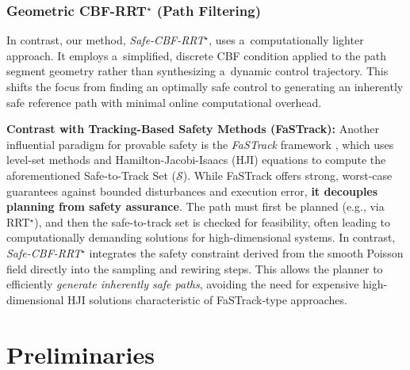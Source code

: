 \documentclass{svproc}
\begin{document}
\subsubsection{Geometric CBF-RRT$^\star$ (Path Filtering)}
    In contrast,
    our method, \emph{Safe-CBF-RRT$^\star$}, uses a~computationally lighter
    approach. It employs a~simplified, discrete CBF condition applied to the
    path segment geometry rather than synthesizing a~dynamic control trajectory.
    This shifts the focus from finding an optimally safe control to generating an
    inherently safe reference path with minimal online computational overhead.

\textbf{Contrast with Tracking-Based Safety Methods (FaSTrack):} Another
influential paradigm for provable safety is the \textit{FaSTrack} framework
\cite{Chen_2021}, which uses level-set methods and
Hamilton-Jacobi-Isaacs (HJI) equations to compute the aforementioned
Safe-to-Track Set ($\mathcal{S}$). While FaSTrack offers strong, worst-case
guarantees against bounded disturbances and execution error,
\textbf{it decouples planning from safety assurance}. The path must first be
planned (e.g., via RRT$^\star$), and then the safe-to-track set is checked for
feasibility, often leading to computationally demanding solutions for
high-dimensional systems. In contrast, \textit{Safe-CBF-RRT$^\star$} integrates the
safety constraint derived from the smooth Poisson field directly into the
sampling and rewiring steps. This allows the planner to efficiently
\textit{generate inherently safe paths}, avoiding the need for expensive
high-dimensional HJI solutions characteristic of FaSTrack-type approaches.

\section{Preliminaries}
\end{document}
